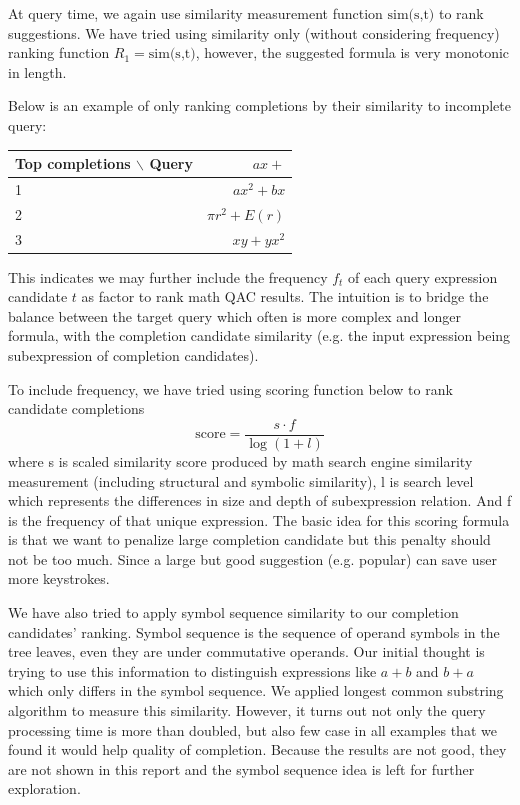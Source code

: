\documentclass[12pt]{article} %
\begin{document}
At query time, we again use similarity measurement function $\text{sim(s,t)}$ 
to rank suggestions.
We have tried using similarity only (without considering frequency) ranking function $R_1 = \text{sim(s,t)}$, however, the suggested formula is very monotonic in length.

Below is an example of only ranking completions by their similarity to incomplete query:
\begin{center}
\begin{tabular}{lr}
Top completions $\backslash$ Query  & $ ax + $ \\
\hline
 1 &  $ ax^2 + bx $ \\
 2 &  $ πr^2 + E(r) $\\
 3 &  $ xy + yx^2$ 
\end{tabular}
\end{center}

This indicates we may further include the frequency $f_t$ of
each query expression candidate $t$ as factor to rank math QAC results.
The intuition is to bridge the balance between the target query which often
is more complex and longer formula,
with the completion candidate similarity (e.g. the input expression being subexpression of completion candidates).

To include frequency, we have tried using scoring function below to rank candidate completions
$$
\text{score} = \frac{s \cdot f}{\log(1 + l)}
$$
where s is scaled similarity score produced by math search engine similarity
measurement (including structural and symbolic similarity), l is search level
which represents the differences in size and depth of subexpression relation.
And f is the frequency of that unique expression.
The basic idea for this scoring formula is that we want to penalize 
large completion candidate but this penalty should not be too much.
Since a large but good suggestion (e.g. popular) can save user more
keystrokes.

We have also tried to apply symbol sequence similarity to our completion candidates' ranking.
Symbol sequence is the sequence of operand symbols in the tree leaves, even they are under
commutative operands. Our initial thought is trying to use this information to distinguish
expressions like $a + b$ and $b + a$ which only differs in the symbol sequence.
We applied longest common substring algorithm to measure this similarity.
However, it turns out not only the query processing time is more than doubled, but also 
few case in all examples that we found it would help quality of completion.
Because the results are not good, they are not shown in this report and the symbol sequence idea
is left for further exploration.
\end{document}
